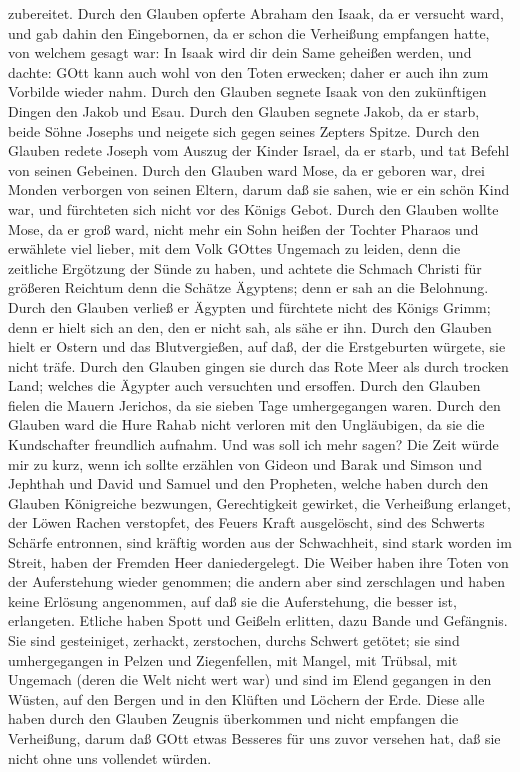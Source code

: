 zubereitet.  Durch den Glauben opferte Abraham den Isaak,
da er versucht ward, und gab dahin den Eingebornen, da er schon die
Verheißung empfangen hatte,  von welchem gesagt war: In
Isaak wird dir dein Same geheißen werden,  und dachte: GOtt
kann auch wohl von den Toten erwecken; daher er auch ihn zum Vorbilde
wieder nahm.  Durch den Glauben segnete Isaak von den
zukünftigen Dingen den Jakob und Esau.  Durch den Glauben
segnete Jakob, da er starb, beide Söhne Josephs und neigete sich gegen
seines Zepters Spitze.  Durch den Glauben redete Joseph vom
Auszug der Kinder Israel, da er starb, und tat Befehl von seinen
Gebeinen.  Durch den Glauben ward Mose, da er geboren war,
drei Monden verborgen von seinen Eltern, darum daß sie sahen, wie er ein
schön Kind war, und fürchteten sich nicht vor des Königs Gebot.
 Durch den Glauben wollte Mose, da er groß ward, nicht mehr
ein Sohn heißen der Tochter Pharaos  und erwählete viel
lieber, mit dem Volk GOttes Ungemach zu leiden, denn die zeitliche
Ergötzung der Sünde zu haben,  und achtete die Schmach
Christi für größeren Reichtum denn die Schätze Ägyptens; denn er sah an
die Belohnung.  Durch den Glauben verließ er Ägypten und
fürchtete nicht des Königs Grimm; denn er hielt sich an den, den er
nicht sah, als sähe er ihn.  Durch den Glauben hielt er
Ostern und das Blutvergießen, auf daß, der die Erstgeburten würgete, sie
nicht träfe.  Durch den Glauben gingen sie durch das Rote
Meer als durch trocken Land; welches die Ägypter auch versuchten und
ersoffen.  Durch den Glauben fielen die Mauern Jerichos, da
sie sieben Tage umhergegangen waren.  Durch den Glauben
ward die Hure Rahab nicht verloren mit den Ungläubigen, da sie die
Kundschafter freundlich aufnahm.  Und was soll ich mehr
sagen? Die Zeit würde mir zu kurz, wenn ich sollte erzählen von Gideon
und Barak und Simson und Jephthah und David und Samuel und den
Propheten,  welche haben durch den Glauben Königreiche
bezwungen, Gerechtigkeit gewirket, die Verheißung erlanget, der Löwen
Rachen verstopfet,  des Feuers Kraft ausgelöscht, sind des
Schwerts Schärfe entronnen, sind kräftig worden aus der Schwachheit,
sind stark worden im Streit, haben der Fremden Heer daniedergelegt.
 Die Weiber haben ihre Toten von der Auferstehung wieder
genommen; die andern aber sind zerschlagen und haben keine Erlösung
angenommen, auf daß sie die Auferstehung, die besser ist, erlangeten.
 Etliche haben Spott und Geißeln erlitten, dazu Bande und
Gefängnis.  Sie sind gesteiniget, zerhackt, zerstochen,
durchs Schwert getötet; sie sind umhergegangen in Pelzen und
Ziegenfellen, mit Mangel, mit Trübsal, mit Ungemach  (deren
die Welt nicht wert war) und sind im Elend gegangen in den Wüsten, auf
den Bergen und in den Klüften und Löchern der Erde.  Diese
alle haben durch den Glauben Zeugnis überkommen und nicht empfangen die
Verheißung,  darum daß GOtt etwas Besseres für uns zuvor
versehen hat, daß sie nicht ohne uns vollendet würden.

